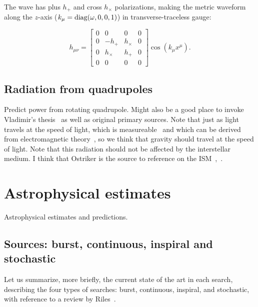 The wave has plus $h_+$ and cross $h_\times$ polarizations, making the metric waveform along the $z$-axis ($k_\mu = \textup{diag}(\omega,0,0,1)$) in transverse-traceless gauge:

\begin{equation}
h_{\mu\nu} =
\left[
\begin{array}{cccc}
0 & 0 & 0 & 0\\
0 & -h_+ & h_\times & 0 \\
0 & h_\times & h_+ & 0\\
0 & 0 & 0 & 0
\end{array} \right] \cos \left(k_\mu x^\mu \right).
\end{equation}



        \subsection{Radiation from quadrupoles}
        \label{radiation}
  
            Predict power from rotating quadrupole. Might also be a good place to invoke Vladimir's thesis~\cite{DergachevThesis} as well as original primary sources. Note that just as light travels at the speed of light, which is measureable~\cite{CODATA} and which can be derived from electromagnetic theory~\cite{GriffithsE}, so we think that gravity should travel at the speed of light. Note that this radiation should not be affected by the interstellar medium. I think that Ostriker is the source to reference on the ISM~\cite{Caldwell1981},~\cite{McKee1977}.

    \section{Astrophysical estimates}
    \label{estimates}

        Astrophysical estimates and predictions.

        \subsection{Sources: burst, continuous, inspiral and stochastic}
        \label{source_types}


            Let us summarize, more briefly, the current state of the art in each search, describing the four types of searches: burst, continuous, inspiral, and stochastic, with reference to a review by Riles~\cite{Riles2013}.

